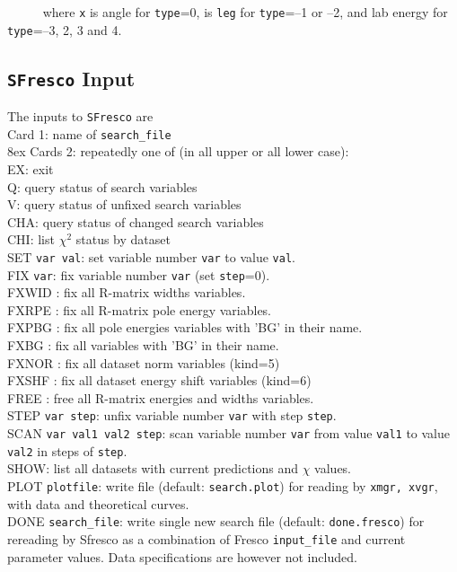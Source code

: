 \documentclass[11pt]{article}
\begin{document}
~~~~~ where {\tt x} is angle for {\tt type}=0, is {\tt leg} for {\tt type}=--1 or --2, and lab energy for {\tt type}=--3, 2, 3 and 4.\\

\subsection*{{\tt SFresco} Input}
The inputs to {\tt SFresco} are\\
Card 1: name of {\tt search\_file}\\

\hangindent 8ex
Cards 2: repeatedly one of (in all upper or all lower case):
\\ EX: exit
\\ Q: query status of search variables
\\ V: query status of unfixed search variables
\\ CHA: query status of changed search variables
\\ CHI: list $\chi^2$ status by dataset
\\ SET {\tt var val}: set variable number {\tt var} to value {\tt val}.
\\ FIX {\tt var}: fix variable number {\tt var} (set {\tt step}=0).
\\ FXWID : fix all R-matrix widths variables.
\\ FXRPE : fix all R-matrix pole energy variables.
\\ FXPBG : fix all pole energies variables with 'BG' in their name.
\\ FXBG : fix all variables with 'BG' in their name.
\\ FXNOR : fix all dataset norm variables (kind=5)
\\ FXSHF : fix all dataset energy shift variables (kind=6)
\\ FREE : free all R-matrix energies and widths variables.
\\ STEP {\tt var step}: unfix variable number {\tt var} with step {\tt step}.
\\ SCAN {\tt var val1 val2 step}: scan variable number {\tt var}
from value {\tt val1} to value {\tt val2} in steps of {\tt step}.
\\ SHOW: list all datasets with current predictions and $\chi$ values.
\\ PLOT {\tt plotfile}: write file (default: {\tt search.plot}) for reading by {\tt xmgr, xvgr},
 with data and theoretical curves.
\\ DONE  {\tt search\_file}: write single new search file (default: {\tt done.fresco}) for rereading by {\sc Sfresco} as a combination of {\sc Fresco} {\tt input\_file} and current parameter values.  Data specifications are  however not included.
\end{document}
